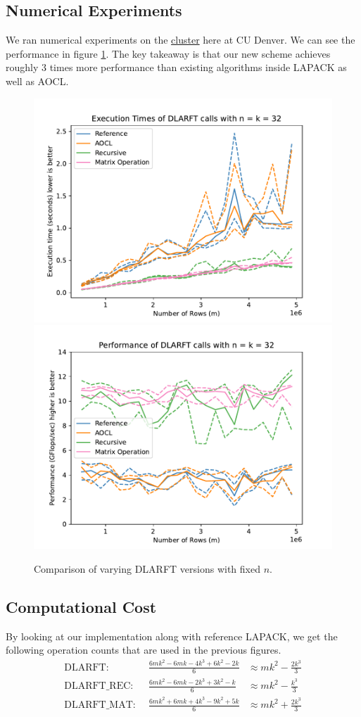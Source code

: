 \documentclass[12pt]{article}
\begin{document}
    \subsection{Numerical Experiments}
    We ran numerical experiments on the \href{https://ccm-docs.readthedocs.io/en/latest/alderaan/#hardware}{cluster}
    here at CU Denver. We can see the performance in figure \ref{fig:DLARFT}. The key takeaway is that our new
    scheme achieves roughly 3 times more performance than existing algorithms inside LAPACK as well as AOCL.
    \begin{figure}
        \centering
        \includegraphics[width=.45\textwidth]{figures/timeDLARFT.pdf}
        \includegraphics[width=.45\textwidth]{figures/flopDLARFT.pdf}
        \caption{Comparison of varying DLARFT versions with fixed $n$.}\label{fig:DLARFT}
    \end{figure}
    \subsection{Computational Cost}
    By looking at our implementation along with reference LAPACK, we get the following operation counts that are
    used in the previous figures.
    \[
    \begin{aligned}
            \text{DLARFT: }&\,      \frac{6mk^2 - 6mk -4k^3 +6k^2 - 2k}{6}&\approx mk^2 - \frac{2k^3}{3}\\
            \text{DLARFT\_REC: }&\, \frac{6mk^2 - 6mk -2k^3 +3k^2 -  k}{6}&\approx mk^2 - \frac{k^3}{3}\\
            \text{DLARFT\_MAT: }&\, \frac{6mk^2 + 6mk +4k^3 -9k^2 + 5k}{6}&\approx mk^2 + \frac{2k^3}{3}
    \end{aligned}
    \]
\end{document}
